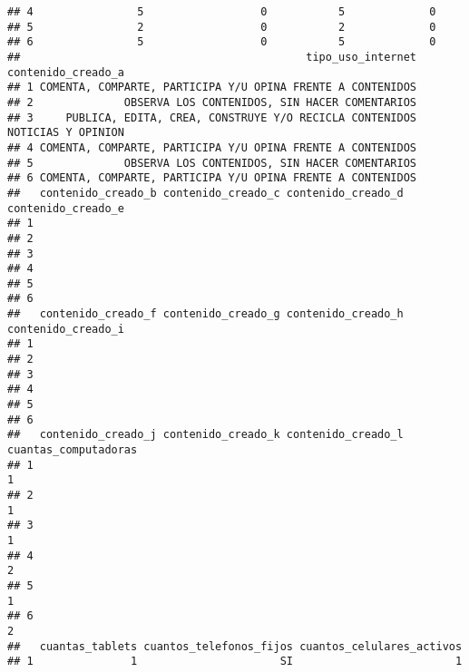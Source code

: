 \documentclass[
]{article}
\begin{document}
\begin{verbatim}
## 4                5                  0           5             0
## 5                2                  0           2             0
## 6                5                  0           5             0
##                                            tipo_uso_internet contenido_creado_a
## 1 COMENTA, COMPARTE, PARTICIPA Y/U OPINA FRENTE A CONTENIDOS                   
## 2              OBSERVA LOS CONTENIDOS, SIN HACER COMENTARIOS                   
## 3     PUBLICA, EDITA, CREA, CONSTRUYE Y/O RECICLA CONTENIDOS NOTICIAS Y OPINION
## 4 COMENTA, COMPARTE, PARTICIPA Y/U OPINA FRENTE A CONTENIDOS                   
## 5              OBSERVA LOS CONTENIDOS, SIN HACER COMENTARIOS                   
## 6 COMENTA, COMPARTE, PARTICIPA Y/U OPINA FRENTE A CONTENIDOS                   
##   contenido_creado_b contenido_creado_c contenido_creado_d contenido_creado_e
## 1                                                                            
## 2                                                                            
## 3                                                                            
## 4                                                                            
## 5                                                                            
## 6                                                                            
##   contenido_creado_f contenido_creado_g contenido_creado_h contenido_creado_i
## 1                                                                            
## 2                                                                            
## 3                                                                            
## 4                                                                            
## 5                                                                            
## 6                                                                            
##   contenido_creado_j contenido_creado_k contenido_creado_l cuantas_computadoras
## 1                                                                             1
## 2                                                                             1
## 3                                                                             1
## 4                                                                             2
## 5                                                                             1
## 6                                                                             2
##   cuantas_tablets cuantos_telefonos_fijos cuantos_celulares_activos
## 1               1                      SI                         1

\end{verbatim}
\end{document}

